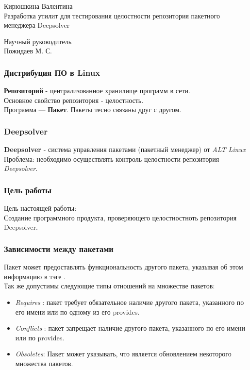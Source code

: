 \documentclass{beamer}
\begin{document}
\begin{frame}
\begin{center}
Кирюшкина Валентина\\
\vspace{1cm}
{\Large Разработка утилит для тестирования целостности репозитория пакетного менеджера Deepsolver}
\end{center}
\begin{tabbing}
\hspace{6.5cm} \= Научный руководитель\\
\> Пожидаев М. С.\\
\end{tabbing}
\end{frame}

\begin{frame}
\frametitle{Дистрибуция ПО в Linux}
\textbf{Репозиторий} - централизованное хранилище программ в сети.\\
\vspace{0.5cm}
Основное свойство репозитория - целостность.\\
\vspace{0.5cm}
Программа --- \textbf{Пакет}. Пакеты тесно связаны друг с другом.

\end{frame}

\begin{frame}
\frametitle{Deepsolver}
\textbf{Deepsolver} - система управления пакетами (пакетный менеджер) от \textit{ALT Linux}\\
\vspace{0.5cm}
Проблема: необходимо осуществлять контроль целостности репозитория \textit{Deepsolver}. 

\end{frame}

\begin{frame}
\frametitle{Цель работы}
Цель настоящей работы:\\
Создание  программного 
продукта, проверяющего целостностноть репозитория Deepsolver.

\end{frame}

\begin{frame}
\frametitle{Зависимости между пакетами}
 Пакет может предоставлять функциональность другого пакета, указывая об 
этом информацию в тэге . \\
Так же допустимы следующие типы отношений на множестве пакетов:
\begin{itemize}
\item
\textit{Requires} : пакет требует обязательное наличие другого пакета, указанного 
по его имени или по одному из его provides.
\item
\textit{Conflicts} :
пакет запрещает наличие другого пакета, указанного по его имени или по
provides.
\item 
\textit{Obsoletes}: Пакет может указывать, что является обновлением некоторого 
множества пакетов. 
\end{itemize}

\end{frame}
\end{document}
